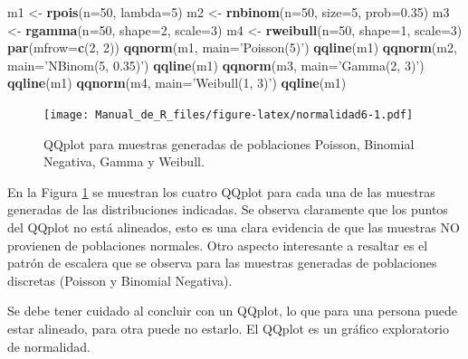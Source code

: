 \documentclass[10pt,]{krantz}
\makeatletter
\newenvironment{Shaded}{\begin{snugshade}}{\end{snugshade}}
\newcommand{\KeywordTok}[1]{\textcolor[rgb]{0.13,0.29,0.53}{\textbf{{#1}}}}
\newcommand{\DataTypeTok}[1]{\textcolor[rgb]{0.13,0.29,0.53}{{#1}}}
\newcommand{\DecValTok}[1]{\textcolor[rgb]{0.00,0.00,0.81}{{#1}}}
\newcommand{\FloatTok}[1]{\textcolor[rgb]{0.00,0.00,0.81}{{#1}}}
\newcommand{\StringTok}[1]{\textcolor[rgb]{0.31,0.60,0.02}{{#1}}}
\newcommand{\NormalTok}[1]{{#1}}
\newenvironment{kframe}{%
\medskip{}
\setlength{\fboxsep}{.8em}
 \def\at@end@of@kframe{}%
 \ifinner\ifhmode%
  \def\at@end@of@kframe{\end{minipage}}%
  \begin{minipage}{\columnwidth}%
 \fi\fi%
 \def\FrameCommand##1{\hskip\@totalleftmargin \hskip-\fboxsep
 \colorbox{shadecolor}{##1}\hskip-\fboxsep
     \hskip-\linewidth \hskip-\@totalleftmargin \hskip\columnwidth}%
 \MakeFramed {\advance\hsize-\width
   \@totalleftmargin\z@ \linewidth\hsize
   \@setminipage}}%
 {\par\unskip\endMakeFramed%
 \at@end@of@kframe}
\renewenvironment{Shaded}{\begin{kframe}}{\end{kframe}}
\let\BeginKnitrBlock\begin \let\EndKnitrBlock\end
\makeatother
\begin{document}
\begin{Shaded}
\begin{Highlighting}[]
\NormalTok{m1 <-}\StringTok{ }\KeywordTok{rpois}\NormalTok{(}\DataTypeTok{n=}\DecValTok{50}\NormalTok{, }\DataTypeTok{lambda=}\DecValTok{5}\NormalTok{)}
\NormalTok{m2 <-}\StringTok{ }\KeywordTok{rnbinom}\NormalTok{(}\DataTypeTok{n=}\DecValTok{50}\NormalTok{, }\DataTypeTok{size=}\DecValTok{5}\NormalTok{, }\DataTypeTok{prob=}\FloatTok{0.35}\NormalTok{)}
\NormalTok{m3 <-}\StringTok{ }\KeywordTok{rgamma}\NormalTok{(}\DataTypeTok{n=}\DecValTok{50}\NormalTok{, }\DataTypeTok{shape=}\DecValTok{2}\NormalTok{, }\DataTypeTok{scale=}\DecValTok{3}\NormalTok{)}
\NormalTok{m4 <-}\StringTok{ }\KeywordTok{rweibull}\NormalTok{(}\DataTypeTok{n=}\DecValTok{50}\NormalTok{, }\DataTypeTok{shape=}\DecValTok{1}\NormalTok{, }\DataTypeTok{scale=}\DecValTok{3}\NormalTok{)}
\KeywordTok{par}\NormalTok{(}\DataTypeTok{mfrow=}\KeywordTok{c}\NormalTok{(}\DecValTok{2}\NormalTok{, }\DecValTok{2}\NormalTok{))}
\KeywordTok{qqnorm}\NormalTok{(m1, }\DataTypeTok{main=}\StringTok{'Poisson(5)'}\NormalTok{)}
\KeywordTok{qqline}\NormalTok{(m1)}
\KeywordTok{qqnorm}\NormalTok{(m2, }\DataTypeTok{main=}\StringTok{'NBinom(5, 0.35)'}\NormalTok{)}
\KeywordTok{qqline}\NormalTok{(m1)}
\KeywordTok{qqnorm}\NormalTok{(m3, }\DataTypeTok{main=}\StringTok{'Gamma(2, 3)'}\NormalTok{)}
\KeywordTok{qqline}\NormalTok{(m1)}
\KeywordTok{qqnorm}\NormalTok{(m4, }\DataTypeTok{main=}\StringTok{'Weibull(1, 3)'}\NormalTok{)}
\KeywordTok{qqline}\NormalTok{(m1)}
\end{Highlighting}
\end{Shaded}

\begin{figure}[htbp]
\centering
\texttt{[image: Manual\_de\_R\_files/figure-latex/normalidad6-1.pdf]}
\caption{\label{fig:normalidad6}QQplot para muestras generadas de
poblaciones Poisson, Binomial Negativa, Gamma y Weibull.}
\end{figure}

En la Figura \ref{fig:normalidad6} se muestran los cuatro QQplot para
cada una de las muestras generadas de las distribuciones indicadas. Se
observa claramente que los puntos del QQplot no está alineados, esto es
una clara evidencia de que las muestras NO provienen de poblaciones
normales. Otro aspecto interesante a resaltar es el patrón de escalera
que se observa para las muestras generadas de poblaciones discretas
(Poisson y Binomial Negativa).

\BeginKnitrBlock{rmdwarning}
Se debe tener cuidado al concluir con un QQplot, lo que para una persona
puede estar alineado, para otra puede no estarlo. El QQplot es un
gráfico exploratorio de normalidad.
\EndKnitrBlock{rmdwarning}
\end{document}
